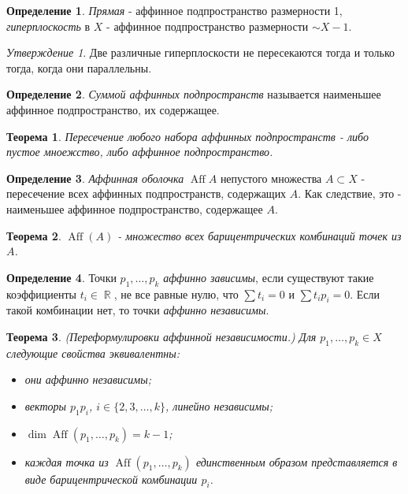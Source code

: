 \documentclass[a4paper,100pt]{article}
\theoremstyle{indented}
\newtheorem{theorem}{Теорема}
\theoremstyle{definition}
\newtheorem{defn}{Определение}
\theoremstyle{remark}
\newtheorem{stat}{Утверждение}
\DeclareMathOperator{\RR}{\mathbb{R}}
\DeclareMathOperator{\Aff}{Aff}
\begin{document}
\begin{defn}
    \textit{Прямая} - аффинное подпространство размерности 1, \textit{гиперплоскость} в $X$ - аффинное подпространство размерности $\sim X - 1$. 
\end{defn}

\begin{stat}
    Две различные гиперплоскости не пересекаются тогда и только тогда, когда они параллельны.
\end{stat}

\begin{defn}
    \textit{Суммой аффинных подпространств} называется наименьшее аффинное подпространство, их содержащее.
\end{defn}

\begin{theorem}
    Пересечение любого набора аффинных подпространств - либо пустое мноежство, либо аффинное подпространство.
\end{theorem}

\begin{defn}
    \textit{Аффинная оболочка} $\Aff{A}$ непустого множества $A\subset X$ - пересечение всех аффинных подпространств, содержащих $A$. Как следствие, это - наименьшее аффинное подпространство, содержащее $A$. 
\end{defn}

\begin{theorem}
    $\Aff(A)$ - множество всех барицентрических комбинаций точек из $A$. 
\end{theorem}

\begin{defn}
    Точки $p_1, \ldots, p_k$ \textit{аффинно зависимы}, если существуют такие коэффициенты $t_i \in \RR$, не все равные нулю, что $\sum t_i = 0$ и $\sum t_ip_i = 0$. Если такой комбинации нет, то точки \textit{аффинно независимы}.
\end{defn}

\begin{theorem}
    (Переформулировки аффинной независимости.) Для $p_1, \ldots, p_k \in X$ следующие свойства эквивалентны: 

    \begin{itemize}
        \item они аффинно независимы; 
        \item векторы $p_1 p_i$, $i\in \{2, 3, \ldots, k\}$, линейно независимы; 
        \item $\dim \Aff (p_1, \ldots, p_k)=k-1$; 
        \item каждая точка из $\Aff(p_1, \ldots, p_k)$ единственным образом представляется в виде барицентрической комбинации $p_i$. 
    \end{itemize}
\end{theorem}
\end{document}
